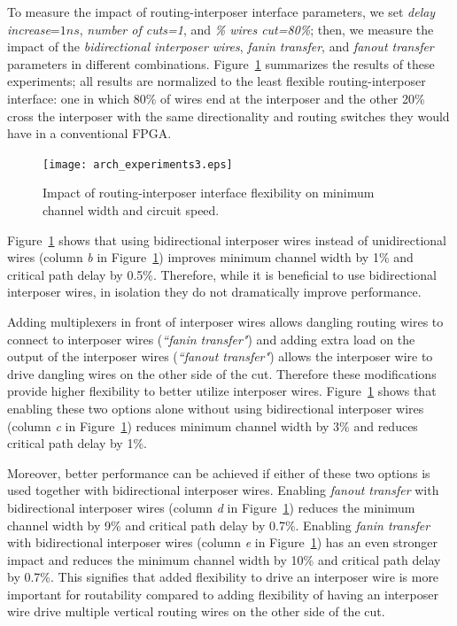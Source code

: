 \documentclass{sig-alternate-2013}
\begin{document}
To measure the impact of routing-interposer interface parameters, we set \textit{delay increase}=$1ns$, \textit{number of cuts=1}, and \textit{\% wires cut=80\%}; then, we measure the impact of the \textit{bidirectional interposer wires}, \textit{fanin transfer}, and \textit{fanout transfer} parameters in different combinations. Figure~\ref{fig:all_arch_experiments} summarizes the results of these experiments; all results are normalized to the least flexible routing-interposer interface: one in which 80\% of wires end at the interposer and the other 20\% cross the interposer with the same directionality and routing switches they would have in a conventional FPGA.

\begin{figure}[!h]
\centering
\texttt{[image: arch\_experiments3.eps]}
\caption{Impact of routing-interposer interface flexibility on minimum channel width and circuit speed.}
\label{fig:all_arch_experiments}
\end{figure}

Figure~\ref{fig:all_arch_experiments} shows that using bidirectional interposer wires instead of unidirectional wires (column \textit{b} in Figure~\ref{fig:all_arch_experiments}) improves minimum channel width by 1\% and critical path delay by 0.5\%. Therefore, while it is beneficial to use bidirectional interposer wires, in isolation they do not dramatically improve performance.

Adding multiplexers in front of interposer wires allows dangling routing wires to connect to interposer wires (\textit{``fanin transfer"}) and adding extra load on the output of the interposer wires (\textit{``fanout transfer"}) allows the interposer wire to drive dangling wires on the other side of the cut. Therefore these modifications provide higher flexibility to better utilize interposer wires. Figure~\ref{fig:all_arch_experiments} shows that enabling these two options alone without using bidirectional interposer wires (column \textit{c} in Figure~\ref{fig:all_arch_experiments}) reduces minimum channel width by 3\% and reduces critical path delay by 1\%. 

Moreover, better performance can be achieved if either of these two options is used together with bidirectional interposer wires. Enabling \textit{fanout transfer} with bidirectional interposer wires (column \textit{d} in Figure~\ref{fig:all_arch_experiments}) reduces the minimum channel width by 9\% and critical path delay by 0.7\%. Enabling \textit{fanin transfer} with bidirectional interposer wires (column \textit{e} in Figure~\ref{fig:all_arch_experiments}) has an even stronger impact and reduces the minimum channel width by 10\% and critical path delay by 0.7\%. This signifies that added flexibility to drive an interposer wire is more important for routability compared to adding flexibility of having an interposer wire drive multiple vertical routing wires on the other side of the cut.
\end{document}
